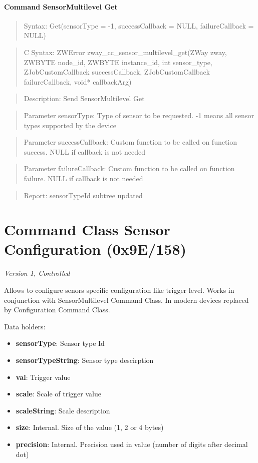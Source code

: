 \paragraph{Command SensorMultilevel Get}
\begin{quote}Syntax: Get(sensorType = -1, successCallback = NULL, failureCallback = NULL)\end{quote}
\begin{quote}C Syntax: ZWError zway\_cc\_sensor\_multilevel\_get(ZWay zway, ZWBYTE node\_id, ZWBYTE instance\_id, int sensor\_type, ZJobCustomCallback successCallback, ZJobCustomCallback failureCallback, void* callbackArg)\end{quote}
\begin{quote}Description: Send SensorMultilevel Get\end{quote}
\begin{quote}Parameter sensorType: Type of sensor to be requested. -1 means all sensor types supported by the device\end{quote}
\begin{quote}Parameter successCallback: Custom function to be called on function success. NULL if callback is not needed\end{quote}
\begin{quote}Parameter failureCallback: Custom function to be called on function failure. NULL if callback is not needed\end{quote}
\begin{quote}Report: sensorTypeId subtree updated\end{quote}


\section{Command Class Sensor Configuration (0x9E/158)}

\textit{Version 1, Controlled}
\newline

Allows to configure senors specific configuration like trigger level. Works in conjunction with SensorMultilevel Command Class. In modern devices replaced by Configuration Command Class.
\newline

\noindent
Data holders:

\begin{itemize}
\item \textbf{sensorType}: Sensor type Id
\item \textbf{sensorTypeString}: Sensor type descirption
\item \textbf{val}: Trigger value
\item \textbf{scale}: Scale of trigger value
\item \textbf{scaleString}: Scale description
\item \textbf{size}: Internal. Size of the value (1, 2 or 4 bytes)
\item \textbf{precision}: Internal. Precision used in value (number of digits after decimal dot)
\end{itemize}

